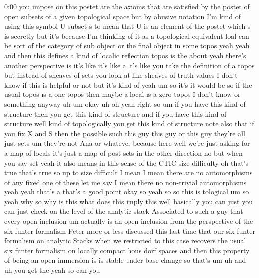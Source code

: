 \begin{unfinished}{0:00}
you  impose  on  this  postet  are  the  axioms
that  are  satisfied  by  the  postet  of  open
subsets  of  a  given  topological
space  but  by  abusive  notation  I'm  kind
of  using  this  symbol  U  subset  s  to  mean
that  U  is  an  element  of  the  postet  which
s  is  secretly  but  it's  because  I'm
thinking  of  it  as  a  topological
equivalent  loal  can  be  sort  of  the
category  of  sub  object  or  the  final
object  in  some  topos  yeah  yeah  and  then
this  defines  a  kind  of  localic
reflection  topos  is  the  about  yeah
there's  another  perspective  is  it's  like
it's  like  a  it's  like  you  take  the
definition  of  a  topos  but  instead  of
sheaves  of  sets  you  look  at  like  sheaves
of  truth  values  I  don't  know  if  this  is
helpful  or  not  but  it's  kind  of  yeah  um
so  it's  it  would  be  so  if  the  usual
topos  is  a  one  topos  then  maybe  a  local
is  a  zero  topos  I  don't  know  or
something
anyway  uh  um  okay  uh  oh  yeah  right  so  um
if  you  have  this  kind  of  structure  then
you  get  this  kind  of  structure  and  if
you  have  this  kind  of  structure  well
kind  of  topologically  you  get  this  kind
of
structure  note  also  that  if  you  fix  X
and  S  then  the  possible  such  this  guy
this  guy  or  this  guy  they're  all  just
sets  um  they're  not  Ana  or  whatever
because  here  well  we're  just  asking  for
a  map  of  locals  it's  just  a  map  of  post
sets  in  the  other  direction  no  but  when
you  say  set  yeah  it  also  means  in  this
sense  of  the  CTIC  size  difficulty  oh
that's  true  that's  true  so  up  to  size
difficult  I  mean  I  mean  there  are  no
automorphisms  of  any  fixed  one  of  these
let  me  say  I  mean  there  no  non-trivial
automorphisms  yeah  yeah  that's  a  that's
a  good  point  okay  so  yeah  so  so  this  is
tological  um  so  yeah  why  so  why  is  this
what  does  this  imply  this
well  basically  you  can  just  you  can  just
check  on  the  level  of  the  analytic  stack
Associated  to  such  a  guy  that  every  open
inclusion  um  actually  is  an  open
inclusion  from  the  perspective  of  the
six  funter  formalism  Peter  more  or  less
discussed  this  last  time  that  our  six
funter  formalism  on  analytic  Stacks  when
we  restricted  to  this  case  recovers  the
usual  six  funter  formalism  on  locally
compact  hous  dorf  spaces  and  then  this
property  of  being  an  open  immersion  is
is  stable  under  base  change  so  that's
um  uh  and  uh  you  get  the  yeah  so  can  you

\end{unfinished}
